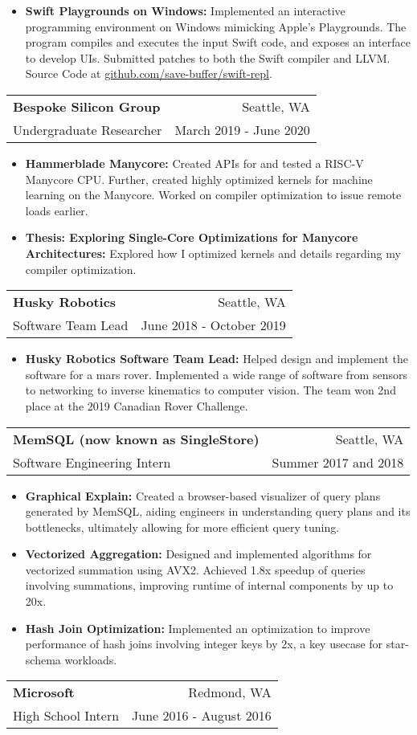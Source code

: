 \documentclass[letterpaper,11pt]{article}
\makeatletter
\newcommand{\resumeItem}[2]{
\vspace{-3pt}
\item\small{
    \textbf{#1}{\textbf{:} #2 \vspace{-2pt}}
  }
}
\newcommand{\resumeSubheading}[4]{
  \vspace{4pt}
  \begin{tabular*}{0.97\textwidth}{l@{\extracolsep{\fill}}r}
    \textbf{#1} & #2 \\
    {\small#3} & {\small #4} \\
  \end{tabular*}\vspace{-5pt}
}
\newcommand{\resumeSubHeadingListEnd}{}
\newcommand{\resumeItemListStart}{\vspace{3pt}\begin{itemize}}
\newcommand{\resumeItemListEnd}{\end{itemize}\vspace{-5pt}}
\makeatother
\begin{document}
\vspace{2pt}
\resumeItemListStart
\resumeItem{Swift Playgrounds on Windows}
{Implemented an interactive programming environment on Windows mimicking Apple's
  Playgrounds. The program compiles and executes the input Swift code, and exposes an
  interface to develop UIs. Submitted patches to both the Swift compiler
  and LLVM. Source Code at \href{https://www.github.com/save-buffer/swift-repl}
  {github.com/save-buffer/swift-repl}.}
\resumeItemListEnd
\vspace{2pt}
\resumeSubheading
{Bespoke Silicon Group}{Seattle, WA}
{Undergraduate Researcher}{March 2019 - June 2020}
\resumeItemListStart
\vspace{2pt}
\resumeItem{Hammerblade Manycore}
{Created APIs for and tested a RISC-V Manycore CPU. Further, created highly optimized kernels
  for machine learning on the Manycore. Worked on compiler optimization to issue remote
  loads earlier.}
\resumeItem{Thesis: Exploring Single-Core Optimizations for Manycore Architectures}{Explored
  how I optimized kernels and details regarding my compiler optimization.}
\resumeItemListEnd
\vspace{2pt}
\resumeSubheading
{Husky Robotics}{Seattle, WA}
{Software Team Lead}{June 2018 - October 2019}
\vspace{2pt}
\resumeItemListStart
\resumeItem{Husky Robotics Software Team Lead}
{Helped design and implement the software for a mars rover. Implemented a wide range of
  software from sensors to networking to inverse kinematics to computer vision.  The team
  won 2nd place at the 2019 Canadian Rover Challenge.}
\resumeItemListEnd
\vspace{2pt}
\resumeSubheading
{MemSQL (now known as SingleStore)}{Seattle, WA}
{Software Engineering Intern}{Summer 2017 and 2018}
\resumeItemListStart
\resumeItem{Graphical Explain}
{Created a browser-based visualizer of query plans generated by MemSQL, aiding
  engineers in understanding query plans and its bottlenecks, ultimately allowing for
  more efficient query tuning.}
\resumeItem{Vectorized Aggregation}
{Designed and implemented algorithms for vectorized summation using AVX2. Achieved 1.8x
  speedup of queries involving summations, improving runtime of internal components by up
  to 20x.}
\resumeItem{Hash Join Optimization}
{Implemented an optimization to improve performance of hash joins involving integer keys
  by 2x, a key usecase for star-schema workloads.}
\resumeItemListEnd
\resumeSubheading
{Microsoft}{Redmond, WA}
{High School Intern}{June 2016 - August 2016}
\resumeSubHeadingListEnd
\end{document}
